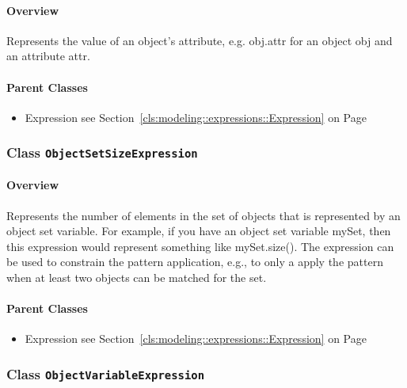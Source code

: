 \paragraph{Overview}

	
			
Represents the value of an object's attribute, e.g. obj.attr for an object obj and an attribute attr.	
		
	



\paragraph{Parent Classes}
\begin{itemize}
\item Expression see Section~\ref{cls:modeling::expressions::Expression} on Page~\pageref{cls:modeling::expressions::Expression}\end{itemize}
\subsubsection{\Large{Class \bfseries \texttt{ObjectSetSizeExpression}\normalfont}}
\label{cls:modeling::patterns::expressions::ObjectSetSizeExpression} 
\paragraph{Overview}

	
			
Represents the number of elements in the set of objects that is represented by an object set variable. For example, if you have an object set variable mySet, then this expression would represent something like mySet.size(). The expression can be used to constrain the pattern application, e.g., to only a apply the pattern when at least two objects can be matched for the set.	
		
	



\paragraph{Parent Classes}
\begin{itemize}
\item Expression see Section~\ref{cls:modeling::expressions::Expression} on Page~\pageref{cls:modeling::expressions::Expression}\end{itemize}
\subsubsection{\Large{Class \bfseries \texttt{ObjectVariableExpression}\normalfont}}
\label{cls:modeling::patterns::expressions::ObjectVariableExpression} 
